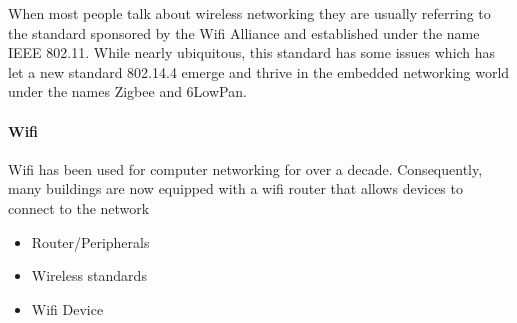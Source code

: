 When most people talk about wireless networking they are usually referring to the standard sponsored by the Wifi Alliance and established under the name IEEE 802.11. While nearly ubiquitous, this standard has some issues which has let a new standard 802.14.4 emerge and thrive in the embedded networking world under the names Zigbee and 6LowPan.
\paragraph{Wifi} Wifi has been used for computer networking for over a decade. Consequently, many buildings are now equipped with a wifi router that allows devices to connect to the network

\begin{itemize}
\item Router/Peripherals
\item Wireless standards
\item Wifi Device
\end{itemize}
